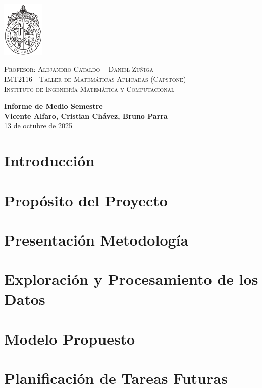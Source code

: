 \documentclass[a4paper, 12pt]{article} %
\numberwithin{figure}{section}
\numberwithin{table}{section}
\newcommand{\departamento}{Instituto de Ingeniería Matemática y Computacional }
\newcommand{\ramo}{Taller de Matemáticas Aplicadas (Capstone) }
\newcommand{\sigla}{IMT2116 }
\newcommand{\titulo}{Informe de Medio Semestre }
\newcommand{\profe}{Alejandro Cataldo -- Daniel Zuñiga }
\newcommand{\nombre}{Vicente Alfaro, Cristian Chávez, Bruno Parra}
\begin{document}
\thispagestyle{empty} %
\begin{minipage}{2cm}
\vspace{-1.5cm}
\includegraphics[width=2cm]{images/logo.pdf}
\vspace{-1.4cm}
\end{minipage}
\begin{minipage}{\linewidth}
\raggedright \footnotesize
\textsc{Profesor: \profe\\
\sigla - \ramo \\
\departamento}
\end{minipage}
\vspace{0.5cm}


\vspace*{8cm}
\begin{center} 
	{\huge \bf \titulo}\\
	\vspace{2mm}
	{\bf \nombre}\\
        \vspace{1mm}
        {13 de octubre de 2025}
\end{center}
\newpage

\section{Introducción}


\section{Propósito del Proyecto}


\section{Presentación Metodología}


\section{Exploración y Procesamiento de los Datos}


\section{Modelo Propuesto}


\section{Planificación de Tareas Futuras}



\end{document}

